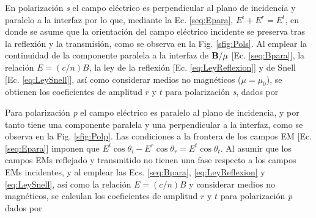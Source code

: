 En polarización \emph{s} el campo eléctrico es perpendicular al plano de incidencia y paralelo a la interfaz por lo que, mediante la Ec. \eqref{seq:Epara}, $E^i + E^r = E^t$, en donde se asume que la orientación del campo eléctrico incidente se preserva tras la reflexión y la transmisión, como se observa en la Fig. \ref{sfig:Pols}. Al emplear la continuidad de la componente paralela a la interfaz de $\vb{B}/\mu$ [Ec. \eqref{seq:Bpara}], la relación $E = (c/n) B$, la ley de la reflexión [Ec. \eqref{eq:LeyReflexion}] y de Snell [Ec. \eqref{eq:LeySnell}], así como considerar medios no magnéticos ($\mu=\mu_0$), se obtienen los coeficientes de amplitud $r$ y $t$ para  polarización \emph{s}, dados por \cite{hecht1998optics}\vspace{-.5em}
%
	\begin{tcolorbox}[title = Coeficientes de amplitud para polarización \emph{s} ]
	\vspace*{-1em}	
	\end{tcolorbox}	 \vspace*{-.75em}\noindent
%
Para polarización \emph{p} el campo eléctrico es paralelo al plano de incidencia, y por tanto tiene una componente paralela y una perpendicular a la interfaz, como se observa en la Fig. \ref{sfig:Polp}. Las condiciones a la frontera de los campos EM [Ec. \eqref{seq:Epara}] imponen que $E^i\cos\theta_i-E^r\cos\theta_r = E^t \cos\theta_t$. Al asumir que los campos EMs reflejado y transmitido no tienen una fase respecto a los campos EMs incidentes, y al emplear las Ecs. \eqref{seq:Bpara},  \eqref{eq:LeyReflexion} y  \eqref{eq:LeySnell}, así como la relación $E = (c/n) B$ y considerar medios no magnéticos, se calculan los  coeficientes de amplitud $r$ y $t$ para  polarización \emph{p} dados por \cite{hecht1998optics}\vspace*{-.75em}
%
	\begin{tcolorbox}[title = Coeficientes de amplitud para polarización \emph{p} ]
	\vspace*{-1em}
	\end{tcolorbox}	\vspace*{-.75em}\noindent

